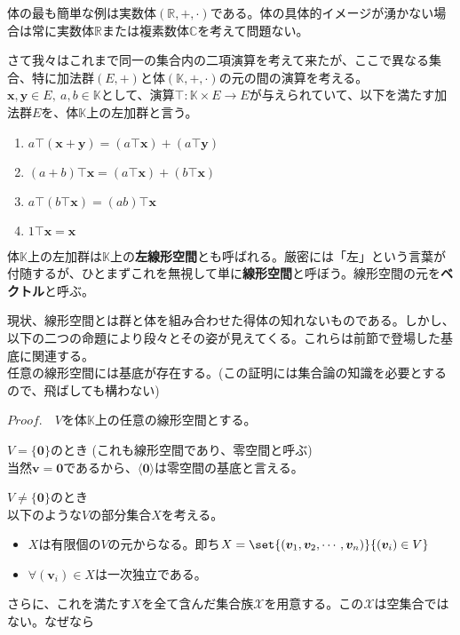 \documentclass[dvipdfmx]{jsarticle}
\begin{document}
体の最も簡単な例は実数体$(\mathbb{R},+,\cdot)$である。体の具体的イメージが湧かない場合は常に実数体$\mathbb{R}$または複素数体$\mathbb{C}$を考えて問題ない。\par
さて我々はこれまで同一の集合内の二項演算を考えて来たが、ここで異なる集合、特に加法群$(E,+)$と体$(\mathbb{K},+,\cdot)$の元の間の演算を考える。$\bm{x},\bm{y} \in E,~a,b \in \mathbb{K}$として、演算$\top:\mathbb{K} \times E \to E$が与えられていて、以下を満たす加法群$E$を、体$\mathbb{K}$上の左加群と言う。
\begin{enumerate}
\item $a \top (\bm{x} + \bm{y}) = (a \top \bm{x})+(a \top \bm{y})$
\item $(a+b) \top \bm{x} = (a \top \bm{x})+(b \top \bm{x})$
\item $a \top (b \top \bm{x}) = (ab) \top \bm{x}$
\item $1 \top \bm{x} = \bm{x}$
\end{enumerate}
体$\mathbb{K}$上の左加群は$\mathbb{K}$上の\textbf{左線形空間}とも呼ばれる。厳密には「左」という言葉が付随するが、ひとまずこれを無視して単に\textbf{線形空間}と呼ぼう。線形空間の元を\textbf{ベクトル}と呼ぶ。\par
現状、線形空間とは群と体を組み合わせた得体の知れないものである。しかし、以下の二つの命題により段々とその姿が見えてくる。これらは前節で登場した基底に関連する。\\
任意の線形空間には基底が存在する。{\scriptsize (この証明には集合論の知識を必要とするので、飛ばしても構わない)}\\\par
$Proof.$　$V$を体$\mathbb{K}$上の任意の線形空間とする。\\\par
$V=\{\bm{0}\}$のとき (これも線形空間であり、零空間と呼ぶ)\\
当然$\bm{v}=\bm{0}$であるから、$\langle\bm{0}\rangle$は零空間の基底と言える。\\\par
$V\neq\{\bm{0}\}$のとき\\
以下のような$V$の部分集合$X$を考える。
\begin{itemize}
\item $X$は有限個の$V$の元からなる。即ち$X=\set{(\bm{v}_1,\bm{v}_2,\cdots,\bm{v}_n)}{(\bm{v}_i) \in V}$
\item $\forall(\bm{v}_i) \in X$は一次独立である。
\end{itemize}
さらに、これを満たす$X$を全て含んだ集合族$\mathscr{X}$を用意する。この$\mathscr{X}$は空集合ではない。なぜなら
\end{document}
